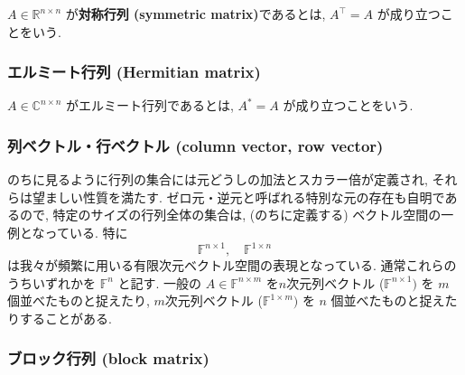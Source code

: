 \documentclass[a4paper]{scrbook}
\theoremstyle{definition}
\begin{document}
\(A\in\mathbb{R}^{n\times n}\) が\textbf{対称行列 (symmetric
matrix)}であるとは, \(A^{\top}=A\) が成り立つことをいう.

\subsubsection*{エルミート行列 (Hermitian
matrix)}\label{-hermitian-matrix}

\(A\in\mathbb{C}^{n\times n}\) がエルミート行列であるとは, \(A^{*}=A\)
が成り立つことをいう.

\subsubsection*{列ベクトル・行ベクトル (column vector, row
vector)}\label{-column-vector-row-vector}

のちに見るように行列の集合には元どうしの加法とスカラー倍が定義され,
それらは望ましい性質を満たす.
ゼロ元・逆元と呼ばれる特別な元の存在も自明であるので,
特定のサイズの行列全体の集合は, (のちに定義する)
ベクトル空間の一例となっている. 特に \[
  \mathbb{F}^{n\times1},\quad\mathbb{F}^{1\times n}
\] は我々が頻繁に用いる有限次元ベクトル空間の表現となっている.
通常これらのうちいずれかを \(\mathbb{F}^{n}\) と記す. 一般の
\(A\in\mathbb{F}^{n\times m}\) を\(n\)次元列ベクトル
(\(\mathbb{F}^{n\times1})\) を \(m\) 個並べたものと捉えたり,
\(m\)次元列ベクトル (\(\mathbb{F}^{1\times m})\) を \(n\)
個並べたものと捉えたりすることがある.

\subsubsection*{ブロック行列 (block matrix)}\label{-block-matrix}
\end{document}
